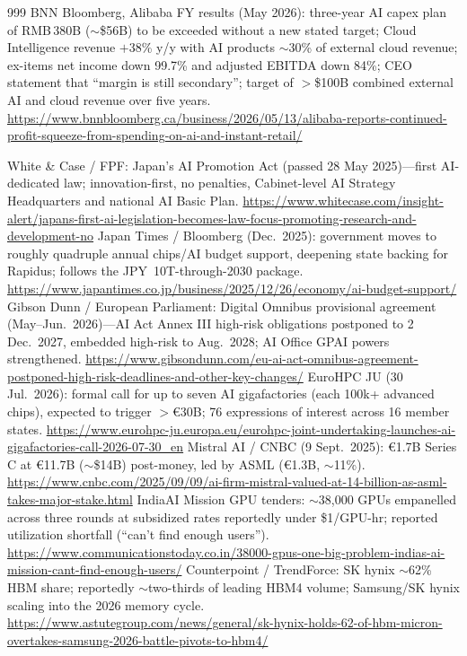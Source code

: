 \begin{thebibliography}{999}
 BNN Bloomberg, Alibaba FY results (May 2026): three-year AI capex plan of RMB\,380B ($\sim$\$56B) to be exceeded without a new stated target; Cloud Intelligence revenue $+$38\% y/y with AI products $\sim$30\% of external cloud revenue; ex-items net income down 99.7\% and adjusted EBITDA down 84\%; CEO statement that ``margin is still secondary''; target of $>$\$100B combined external AI and cloud revenue over five years. \url{https://www.bnnbloomberg.ca/business/2026/05/13/alibaba-reports-continued-profit-squeeze-from-spending-on-ai-and-instant-retail/}

 White \& Case / FPF: Japan's AI Promotion Act (passed 28 May 2025)---first AI-dedicated law; innovation-first, no penalties, Cabinet-level AI Strategy Headquarters and national AI Basic Plan. \url{https://www.whitecase.com/insight-alert/japans-first-ai-legislation-becomes-law-focus-promoting-research-and-development-no}
 Japan Times / Bloomberg (Dec.\ 2025): government moves to roughly quadruple annual chips/AI budget support, deepening state backing for Rapidus; follows the JPY~10T-through-2030 package. \url{https://www.japantimes.co.jp/business/2025/12/26/economy/ai-budget-support/}
 Gibson Dunn / European Parliament: Digital Omnibus provisional agreement (May--Jun.\ 2026)---AI Act Annex III high-risk obligations postponed to 2 Dec.\ 2027, embedded high-risk to Aug.\ 2028; AI Office GPAI powers strengthened. \url{https://www.gibsondunn.com/eu-ai-act-omnibus-agreement-postponed-high-risk-deadlines-and-other-key-changes/}
 EuroHPC JU (30 Jul.\ 2026): formal call for up to seven AI gigafactories (each 100k+ advanced chips), expected to trigger $>$€30B; 76 expressions of interest across 16 member states. \url{https://www.eurohpc-ju.europa.eu/eurohpc-joint-undertaking-launches-ai-gigafactories-call-2026-07-30_en}
 Mistral AI / CNBC (9 Sept.\ 2025): €1.7B Series C at €11.7B ($\sim$\$14B) post-money, led by ASML (€1.3B, $\sim$11\%). \url{https://www.cnbc.com/2025/09/09/ai-firm-mistral-valued-at-14-billion-as-asml-takes-major-stake.html}
 IndiaAI Mission GPU tenders: $\sim$38,000 GPUs empanelled across three rounds at subsidized rates reportedly under \$1/GPU-hr; reported utilization shortfall (``can't find enough users''). \url{https://www.communicationstoday.co.in/38000-gpus-one-big-problem-indias-ai-mission-cant-find-enough-users/}
 Counterpoint / TrendForce: SK hynix $\sim$62\% HBM share; reportedly $\sim$two-thirds of leading HBM4 volume; Samsung/SK hynix scaling into the 2026 memory cycle. \url{https://www.astutegroup.com/news/general/sk-hynix-holds-62-of-hbm-micron-overtakes-samsung-2026-battle-pivots-to-hbm4/}

\end{thebibliography}
